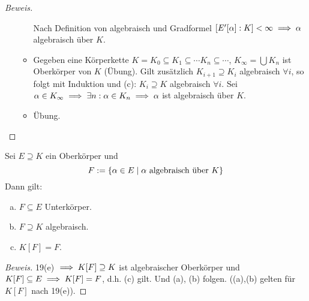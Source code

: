 \documentclass[a4paper]{report}
\begin{document}
\begin{lemm}
\begin{proof}[Beweis]
\begin{enumerate}[(a)]
\begin{itemize}
          Nach Definition von algebraisch und Gradformel $[E'[\alpha] : K] < \infty \implies \alpha$ algebraisch über $K$.
          \item Gegeben eine Körperkette $K = K_{0} \subseteq K_{1} \subseteq \cdots K_{n} \subseteq \cdots$, $K_{\infty} = \bigcup K_{n}$ ist Oberkörper von $K$ (Übung). Gilt zusätzlich $K_{i+1} \supseteq K_{i}$ algebraisch $\forall i$, so folgt mit Induktion und (c): $K_{i} \supseteq K$ algebraisch $\forall i.$ Sei $\alpha \in K_{\infty} \implies \exists n: \alpha \in K_{n} \implies \alpha$ ist algebraisch über $K$.
          \item Übung.
        \end{itemize}
\end{enumerate}
\end{proof}
\end{lemm}

\begin{kor}
  Sei $E \supseteq K$ ein Oberkörper und
  \[F:= \{ \alpha \in E \mid \alpha \text{ algebraisch über } K\}\]
  Dann gilt:
  \begin{enumerate}[(a)]
    \item $F \subseteq E$ Unterkörper.
    \item $F \supseteq K$ algebraisch.
    \item $K[F] = F$.
  \end{enumerate}
\begin{proof}[Beweis]
  19(e) $\implies K[F] \supseteq K$ ist algebraischer Oberkörper und $K[F] \subseteq E \implies K[F] = F$, d.h. (c) gilt. Und (a), (b) folgen. ((a),(b) gelten für $K[F]$ nach 19(e)).
\end{proof}
\end{kor}
\end{document}
